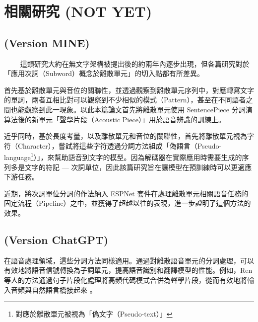 
\section{相關研究 (NOT YET)}  
\subsection{(Version MINE)}
　　
這類研究大約在無文字架構被提出後的約兩年內逐步出現，但各篇研究對於「應用次詞（Subword）概念於離散單元」的切入點都有所差異。

首先\cite{ren_speech_2022}基於離散單元與音位的關聯性，並透過觀察到離散單元序列中，對應轉寫文字的單詞，兩者互相比對可以觀察到不少相似的模式（Pattern），甚至在不同語者之間也能觀察到此一現象。以此本篇論文首先將離散單元使用 SentencePiece 分詞演算法後的新單元「聲學片段（Acoustic Piece）」用於語音辨識的訓練上。

近乎同時，\cite{wu_wav2seq_2023}基於長度考量，以及離散單元和音位的關聯性，首先將離散單元視為字符（Character），嘗試將這些字符透過分詞方法組成「偽語言（Pseudo-language\footnote{對應於離散單元被視為「偽文字（Pseudo-text）」}）」，來幫助語音到文字的模型。因為解碼器在實際應用時需要生成的序列多是文字的符記 --- 次詞單位，因此該篇研究旨在讓模型在預訓練時可以更適應下游任務。


近期，\cite{chang_exploring_2024}將次詞單位分詞的作法納入 ESPNet 套件在處理離散單元相關語音任務的固定流程（Pipeline）之中，並獲得了超越以往的表現，進一步證明了這個方法的效果。
















\myhline





\subsection{(Version ChatGPT)}


在語音處理領域，這些分詞方法同樣適用。通過對離散語音單元的分詞處理，可以有效地將語音信號轉換為子詞單元，提高語音識別和翻譯模型的性能。例如，Ren 等人的方法通過句子片段化處理將高頻代碼模式合併為聲學片段，從而有效地將輸入音頻與自然語言橋接起來 \cite{ren_speech_2022}。

